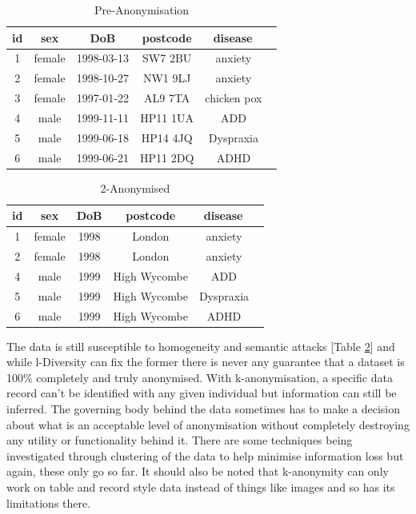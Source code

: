 \begin{center}
    \begin{longtable}{ |c|c|c|c|c| }
    \caption{Pre-Anonymisation}
    \label{tbl:pre-anon}
    \hline
    \textbf{id} & \textbf{sex} & \textbf{DoB} & \textbf{postcode} & \textbf{disease} \ \\ \hline
    1 & female & 1998-03-13 & SW7 2BU & anxiety \ \\ \hline
    2 & female & 1998-10-27 & NW1 9LJ & anxiety \ \\ \hline
    3 & female & 1997-01-22 & AL9 7TA & chicken pox \ \\ \hline
    4 & male & 1999-11-11 & HP11 1UA & ADD \ \\ \hline
    5 & male & 1999-06-18 & HP14 4JQ & Dyspraxia \ \\ \hline
    6 & male & 1999-06-21 & HP11 2DQ & ADHD \ \\ \hline
    \end{longtable}
    
    \begin{longtable}{ |c|c|c|c|c| }
    \caption{2-Anonymised}
    \label{tbl:2-anon}
    \hline
    \textbf{id} & \textbf{sex} & \textbf{DoB} & \textbf{postcode} & \textbf{disease} \ \\ \hline
    \rowcolor{lightgray} 1 & female & 1998 & London & anxiety \ \\ \hline
    \rowcolor{lightgray} 2 & female & 1998 & London & anxiety \ \\ \hline
    \rowcolor{gray} 4 & male & 1999 & High Wycombe & ADD \ \\ \hline
    \rowcolor{gray} 5 & male & 1999 & High Wycombe & Dyspraxia \ \\ \hline
    \rowcolor{gray} 6 & male & 1999 & High Wycombe & ADHD \ \\ \hline
    \end{longtable}
\end{center}

The data is still susceptible to homogeneity and semantic attacks [Table \ref{tbl:2-anon}] and while {l-Diversity} can fix the former there is never any guarantee that a dataset is 100\% completely and truly anonymised. With k-anonymisation, a specific data record can't be identified with any given individual but information can still be inferred. The governing body behind the data sometimes has to make a decision about what is an acceptable level of anonymisation without completely destroying any utility or functionality behind it. There are some techniques being investigated through clustering of the data to help minimise information loss \cite{anon_cluster} but again, these only go so far. It should also be noted that k-anonymity can only work on table and record style data instead of things like images and so has its limitations there.


